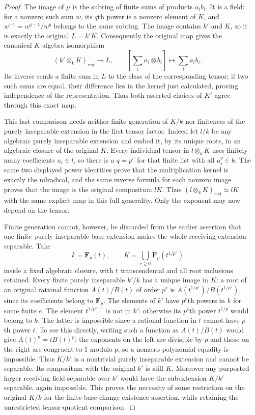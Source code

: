 \begin{proof}
The image of $\mu$ is the subring of finite sums
of products $a_i b_i$. It is a field: for a
nonzero such sum $w$, its $q$th power is a
nonzero element of $K$, and
$w^{-1}=w^{q-1}/w^q$ belongs to the same subring.
The image contains $k'$ and $K$, so it is exactly
the original $L=k'K$. Consequently the original
map gives the canonical $K$-algebra isomorphism
$$
(k'\otimes_k K)_{red}\longrightarrow L,
\qquad [\sum_i a_i\otimes b_i]\longmapsto\sum_i a_i b_i.
$$
Its inverse sends a finite sum in $L$ to the
class of the corresponding tensor; if two such
sums are equal, their difference lies in the
kernel just calculated, proving independence
of the representation. Thus both asserted
choices of $K'$ agree through this exact map.

This last comparison needs neither finite
generation of $K/k$ nor finiteness of the purely
inseparable extension in the first tensor factor.
Indeed let $l/k$ be any algebraic purely
inseparable extension and embed it, by its unique
roots, in an algebraic closure of the original
$K$. Every individual tensor in $l\otimes_k K$
uses finitely many coefficients $a_i\in l$,
so there is a $q=p^e$ for that finite list with
all $a_i^q\in k$. The same two displayed power
identities prove that the multiplication kernel
is exactly the nilradical, and the same inverse
formula for each nonzero image proves that the
image is the original compositum $lK$.
Thus $(l\otimes_k K)_{red}\simeq lK$ with the
same explicit map in this full generality.
Only the exponent may now depend on the tensor.

Finite generation cannot, however, be discarded
from the earlier assertion that one finite
purely inseparable base extension makes the
whole receiving extension separable. Take
$$
k=\mathbf F_p(t),\qquad
K=\bigcup_{r\geq0}\mathbf F_p(t^{1/p^r})
$$
inside a fixed algebraic closure, with $t$
transcendental and all root inclusions retained.
Every finite purely inseparable $k'/k$ has a
unique image in $K$: a root of an original
rational function $A(t)/B(t)$ of order $p^r$
is $A(t^{1/p^r})/B(t^{1/p^r})$, since its
coefficients belong to $\mathbf F_p$.
The elements of $k'$ have
$p^e$th powers in $k$ for some finite $e$.
The element $t^{1/p^{e+1}}$ is not in $k'$:
otherwise its $p^e$th power $t^{1/p}$ would
belong to $k$. The latter is impossible since
a rational function in $t$ cannot have $p$th
power $t$. To see this directly, writing such
a function as $A(t)/B(t)$ would give
$A(t)^p=tB(t)^p$; the exponents on the left
are divisible by $p$ and those on the right
are congruent to $1$ modulo $p$, so a nonzero
polynomial equality is impossible.
Thus $K/k'$ is a nontrivial purely inseparable
extension and cannot be separable. Its
compositum with the original $k'$ is still
$K$. Moreover any purported larger receiving
field separable over $k'$ would have the
subextension $K/k'$ separable, again impossible.
This proves the necessity of some restriction
on the original $K/k$ for the finite-base-change
existence assertion, while retaining the
unrestricted tensor-quotient comparison.
\end{proof}

